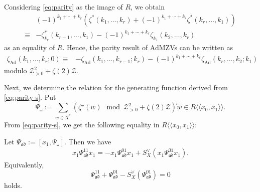 \documentclass[15pt,oneside,reqno]{amsart}
\theoremstyle{remark}{
\newtheorem{lem}[df]{Lemma}
\newtheorem{prop}[df]{Proposition}
\newtheorem{ex}[df]{Example}
\newtheorem{rmk}[df]{Remark}
}
\newcommand{\Q}{\mathbb{Q}}
\newcommand{\ad}{\mathfrak{ad}}
\begin{document}
Considering \eqref{eq:parity} as the image of $R$, we obtain
\begin{align*}
&(-1)^{k_1+\cdots + k_r}(\zeta^*(k_1,\ldots,k_r) + (-1)^{k_1+\cdots + k_r} \zeta^*(k_r,\ldots,k_1))\\
\equiv &- \zeta_{k_r}^*(k_{r-1},\ldots,k_1) - (-1)^{k_1+\cdots+k_r} \zeta_{k_1}(k_2,\ldots,k_r)
\end{align*}
as an equality of $R$.
Hence, the parity result of AdMZVs can be written as
\begin{align}
\zeta_{\mathrm{Ad}}(k_1,\ldots,k_r;0)
\equiv&- \zeta_{\mathrm{Ad}}(k_1,\ldots,k_{r-1};k_r) - (-1)^{k_1+\cdots + k_r} \zeta_{\mathrm{Ad}}(k_r,\ldots,k_{2};k_1)  \label{eq:parity-s}
\end{align}
modulo $\mathcal{Z}_{>0}^2 +\zeta(2)\mathcal{Z}$.

Next, we determine the relation for the generating function derived from \eqref{eq:parity-s}.
Put
\[
\Psi_{\shuffle} := \sum_{w \in X^*} (\zeta^{\shuffle}(w) \mod \mathcal{Z}_{>0}^2 + \zeta(2)\mathcal{Z}) \overset{\leftarrow}{w} \in R\langle\langle x_0,x_1 \rangle \rangle.
\]
From \eqref{eq:parity-s}, we get the following equality in $R\langle\langle x_0,x_1 \rangle \rangle$:

\begin{prop}
Let $\Psi_{\ad} := [x_1,\Psi_{\shuffle}]$. Then we have
\begin{align*}
x_1\Psi_{\ad}^{11} x_1 = -x_1\Psi_{\ad}^{01}x_1 + S_X^{\vee}(x_1\Psi_{\ad}^{01}x_1). 
\end{align*}
Equivalently, 
\[
\Psi_{\ad}^{11} + \Psi_{\ad}^{01} - S_X^{\vee}(\Psi_{\ad}^{01}) = 0
\]
holds.
\end{prop}
\end{document}
